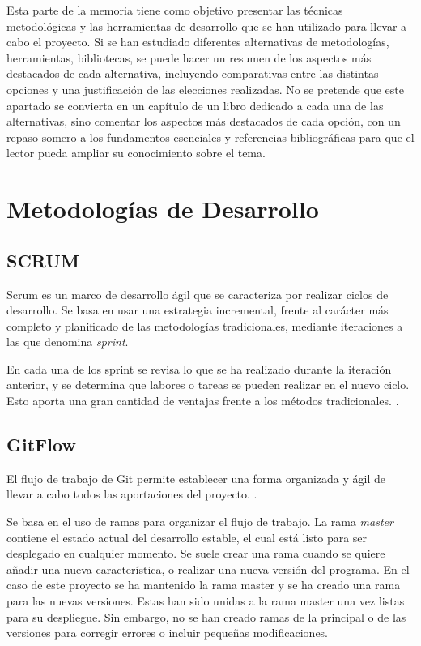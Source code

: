 
Esta parte de la memoria tiene como objetivo presentar las técnicas metodológicas y las herramientas de desarrollo que se han utilizado para llevar a cabo el proyecto. Si se han estudiado diferentes alternativas de metodologías, herramientas, bibliotecas, se puede hacer un resumen de los aspectos más destacados de cada alternativa, incluyendo comparativas entre las distintas opciones y una justificación de las elecciones realizadas. 
No se pretende que este apartado se convierta en un capítulo de un libro dedicado a cada una de las alternativas, sino comentar los aspectos más destacados de cada opción, con un repaso somero a los fundamentos esenciales y referencias bibliográficas para que el lector pueda ampliar su conocimiento sobre el tema.


\section{Metodologías de Desarrollo}

\subsection{SCRUM}
\label{sub:scrum}

Scrum es un marco de desarrollo ágil que se caracteriza por realizar ciclos de desarrollo. Se basa en usar una estrategia incremental, frente al carácter más completo y planificado de las metodologías tradicionales, mediante iteraciones a las que denomina \textit{sprint}. 

En cada una de los sprint se revisa lo que se ha realizado durante la iteración anterior, y se determina que labores o tareas se pueden realizar en el nuevo ciclo. Esto aporta una gran cantidad de ventajas frente a los métodos tradicionales. \citep{wiki:SCRUM}.

\subsection{GitFlow}
\label{sub:gitflow}
El flujo de trabajo de Git permite establecer una forma organizada y ágil de llevar a cabo todos las aportaciones del proyecto. \citep{wiki:gitflow}.

Se basa en el uso de ramas para organizar el flujo de trabajo. La rama \textit{master} contiene el estado actual del desarrollo estable, el cual está listo para ser desplegado en cualquier momento. Se suele crear una rama cuando se quiere añadir una nueva característica, o realizar una nueva versión del programa. 
En el caso de este proyecto se ha mantenido la rama master y se ha creado una rama para las nuevas versiones. Estas han sido unidas a la rama master una vez listas para su despliegue.
Sin embargo, no se han creado ramas de la principal o de las versiones para corregir errores o incluir pequeñas modificaciones. 

